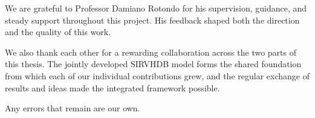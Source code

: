 

\acknowledgements

We are grateful to Professor Damiano Rotondo for his supervision, guidance, and steady support throughout this project.
His feedback shaped both the direction and the quality of this work.

We also thank each other for a rewarding collaboration across the two parts of this thesis.
The jointly developed SIRVHDB model forms the shared foundation from which each of our individual contributions grew, and the regular exchange of results and ideas made the integrated framework possible.

Any errors that remain are our own.
